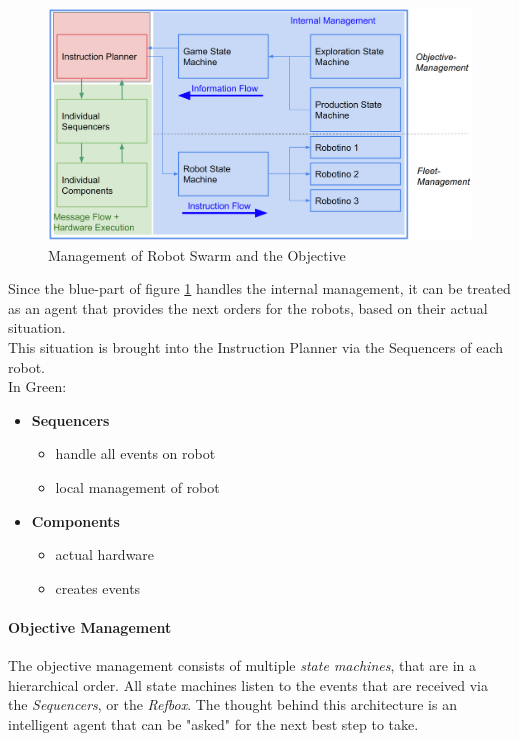 \begin{figure}[h]
\centering
\includegraphics[scale=0.23]{pic/Instructionplanner2018.png}
\caption{Management of Robot Swarm and the Objective}
\label{fig:instr_overview}
\end{figure}
\newpage

Since the blue-part of figure \ref{fig:instr_overview} handles the internal management, it can be treated as an agent that provides the next orders for the robots, based on their actual situation.\\
This situation is brought into the Instruction Planner via the Sequencers of each
robot.\\
In Green: \\
\begin{itemize}
    \item \textbf{Sequencers}
    \begin{itemize}
        \item handle all events on robot
        \item local management of robot
    \end{itemize}
    \item \textbf{Components}
    \begin{itemize}
        \item actual hardware
        \item creates events
    \end{itemize}
\end{itemize}


\paragraph{Objective Management}
The objective management consists of multiple \textit{state machines}, that are in
a hierarchical order.
All state machines listen to the events that are received via the \textit{Sequencers}, or
the \textit{Refbox}.
The thought behind this architecture is an intelligent agent that can be "asked" for the next
best step to take.\\

